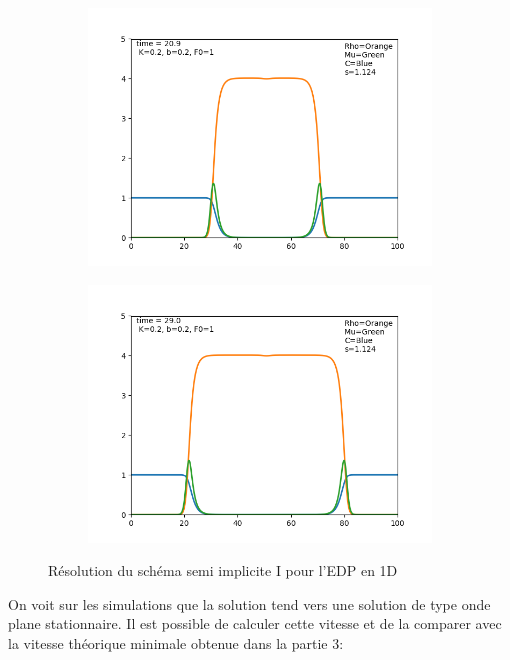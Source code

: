 \begin{figure}[hbt!]
\begin{subfigure}[b]{0.45\textwidth}
\includegraphics[width=\textwidth]{Images/edp_1d_2.png}
\end{subfigure}
\begin{subfigure}[b]{0.45\textwidth}
\includegraphics[width=\textwidth]{Images/edp_1d_3.png}
\end{subfigure}
\caption{Résolution du schéma semi implicite I pour l'EDP en 1D} 
\end{figure}
On voit sur les simulations que la solution tend vers une solution de type onde plane stationnaire. Il est possible de calculer cette vitesse et de la comparer avec la vitesse théorique minimale obtenue dans la partie 3: 

\newpage
 
